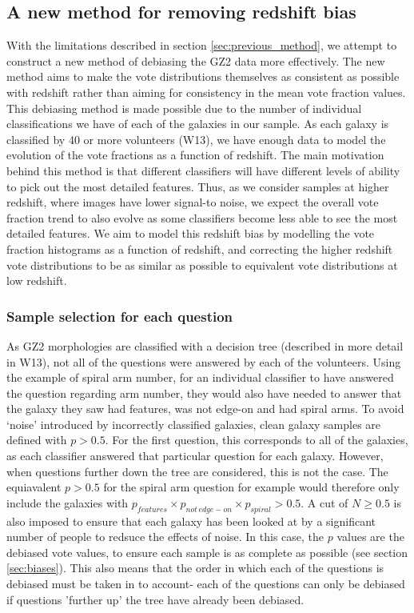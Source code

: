 \documentclass[useAMS,usenatbib]{mn2e}
\begin{document}
\subsection{A new method for removing redshift bias}
\label{sec:new_method}

With the limitations described in section \ref{sec:previous_method}, we attempt to construct a new method of debiasing the GZ2 data more effectively. The new method aims to make the vote distributions themselves as consistent  as possible with redshift rather than aiming for consistency in the mean vote fraction values. This debiasing method is made possible due to the number of individual classifications we have of each of the galaxies in our sample. As each galaxy is classified by 40 or more volunteers (W13), we have enough data to model the evolution of the vote fractions as a function of redshift. The main motivation behind this method is that different classifiers will have different levels of ability to pick out the most detailed features. Thus, as we consider samples at higher redshift, where images have lower signal-to noise, we expect the overall vote fraction trend to also evolve as some classifiers become less able to see the most detailed features. We aim to model this redshift bias by modelling the vote fraction histograms as a function of redshift, and correcting the higher redshift vote distributions to be as similar as possible to equivalent vote distributions at low redshift.

\subsubsection{Sample selection for each question}

As GZ2 morphologies are classified with a decision tree (described in more detail in W13), not all of the questions were answered by each of the volunteers. Using the example of spiral arm number, for an individual classifier to have answered the question regarding arm number, they would also have needed to answer that the galaxy they saw had features, was not edge-on and had spiral arms. To avoid `noise' introduced by incorrectly classified galaxies, clean galaxy samples are defined with $p > 0.5$. For the first question, this corresponds to all of the galaxies, as each classifier answered that particular question for each galaxy. However, when questions further down the tree are considered, this is not the case. The equiavalent $p>0.5$ for the spiral arm question for example would therefore only include the galaxies with $p_{features} \times p_{not \, edge-on} \times p_{spiral} > 0.5$. A cut of $N \geq 0.5$ is also imposed to ensure that each galaxy has been looked at by a significant number of people to redsuce the effects of noise. In this case, the $p$ values are the debiased vote values, to ensure each sample is as complete as possible (see section \ref{sec:biases}). This also means that the order in which each of the questions is debiased must be taken in to account- each of the questions can only be debiased if questions 'further up' the tree have already been debiased.
\end{document}
